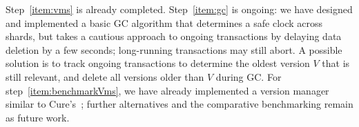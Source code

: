 Step~\ref{item:vms} is already completed.
Step~\ref{item:gc} is ongoing: we have designed and implemented a basic GC algorithm that determines a safe clock across shards, but takes a cautious approach to ongoing transactions by delaying data deletion by a few seconds; long-running transactions may still abort.
A possible solution is to track ongoing transactions to determine the oldest version $V$ that is still relevant, and delete all versions older than $V$ during GC.
For step~\ref{item:benchmarkVms}, we have already implemented a version manager similar to Cure's~\cite{cure}; further alternatives and the comparative benchmarking remain as future work.





